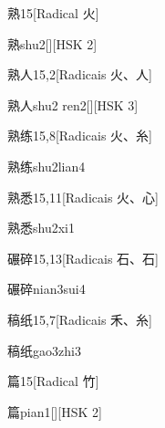 \begin{entry}{熟}{15}[Radical ⽕]
  \begin{phonetics}{熟}{shu2}[][HSK 2]
  \end{phonetics}
\end{entry}

\begin{entry}{熟人}{15,2}[Radicais ⽕、⼈]
  \begin{phonetics}{熟人}{shu2 ren2}[][HSK 3]
  \end{phonetics}
\end{entry}

\begin{entry}{熟练}{15,8}[Radicais ⽕、⽷]
  \begin{phonetics}{熟练}{shu2lian4}
  \end{phonetics}
\end{entry}

\begin{entry}{熟悉}{15,11}[Radicais ⽕、⼼]
  \begin{phonetics}{熟悉}{shu2xi1}
  \end{phonetics}
\end{entry}

\begin{entry}{碾碎}{15,13}[Radicais ⽯、⽯]
  \begin{phonetics}{碾碎}{nian3sui4}
  \end{phonetics}
\end{entry}

\begin{entry}{稿纸}{15,7}[Radicais ⽲、⽷]
  \begin{phonetics}{稿纸}{gao3zhi3}
  \end{phonetics}
\end{entry}

\begin{entry}{篇}{15}[Radical ⽵]
  \begin{phonetics}{篇}{pian1}[][HSK 2]
  \end{phonetics}
\end{entry}

